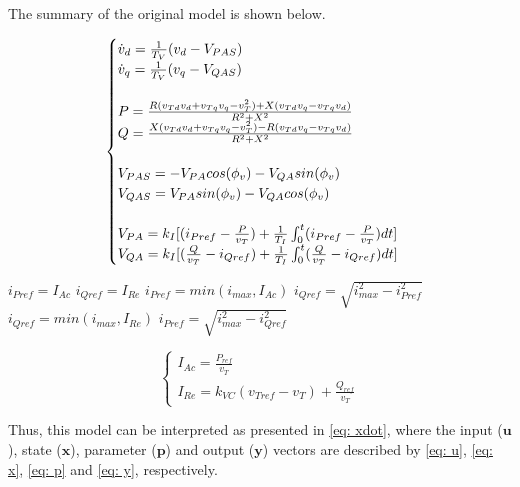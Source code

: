 The summary of the original model is shown below.

\begin{equation}
	\begin{cases}
		\dot{v}_{d} = \frac{1}{T_{V}}(v_{d} - V_{PAS}) \\
		\dot{v}_{q} = \frac{1}{T_{V}}(v_{q} - V_{QAS}) \\
		\\
		P = \frac{R(v_{Td}v_{d} + v_{Tq}v_{q} - v_{T}^{2}) + X(v_{Td}v_{q} - v_{Tq}v_{d})}{R^{2} + X^{2}} \\
		Q = \frac{X(v_{Td}v_{d} + v_{Tq}v_{q} - v_{T}^{2}) - R(v_{Td}v_{q} - v_{Tq}v_{d})}{R^{2} + X^{2}} \\
		\\
		V_{PAS} = -V_{PA}cos(\phi_{v}) - V_{QA}sin(\phi_{v}) \\
		V_{QAS} = V_{PA}sin(\phi_{v}) - V_{QA}cos(\phi_{v}) \\
		\\
		V_{PA} = k_{I}[(i_{Pref} - \frac{P}{v_{T}}) + \frac{1}{T_{I}}\int\displaylimits_{0}^{t} (i_{Pref} - \frac{P}{v_{T}})dt]\\
		V_{QA} = k_{I}[(\frac{Q}{v_{T}} - i_{Qref}) + \frac{1}{T_{I}}\int\displaylimits_{0}^{t} (\frac{Q}{v_{T}} - i_{Qref})dt]
	\end{cases}
	\label{eq: summary_original}
\end{equation}

\medskip

\begin{algorithmic}
		\STATE $i_{Pref} = I_{Ac}$
		\STATE $i_{Qref} = I_{Re}$
	\ELSE
			\STATE $i_{Pref} = min(i_{max}, I_{Ac})$
			\STATE $i_{Qref} = \sqrt{i_{max}^{2} - i_{Pref}^{2}}$
		\ELSE
			\STATE $i_{Qref} = min(i_{max}, I_{Re})$
			\STATE $i_{Pref} = \sqrt{i_{max}^{2} - i_{Qref}^{2}}$
		\ENDIF
	\ENDIF
\end{algorithmic}

\begin{equation*}
	\begin{cases}
		I_{Ac} = \frac{P_{ref}}{v_{T}} \\
		I_{Re} = k_{VC}(v_{Tref} - v_{T}) + \frac{Q_{ref}}{v_{T}}
	\end{cases}
\end{equation*}

Thus, this model can be interpreted as presented in \eqref{eq: xdot}, where the input ($\mathbf{u}$), state ($\mathbf{x}$), parameter ($\mathbf{p}$) and output ($\mathbf{y}$) vectors are described by \eqref{eq: u}, \eqref{eq: x}, \eqref{eq: p} and \eqref{eq: y}, respectively.

